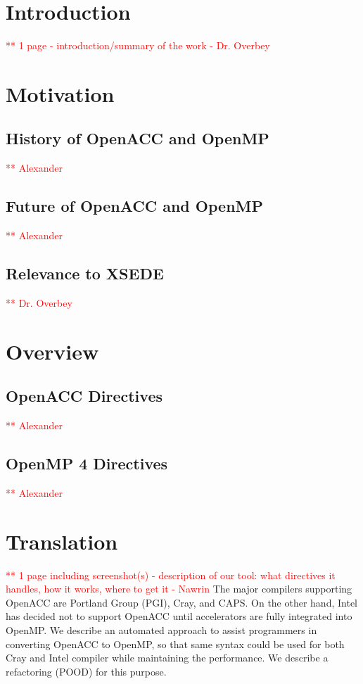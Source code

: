 \documentclass{sig-alternate-05-2015}
\newcommand\todo[1]{\textcolor{red}{** #1}}
\begin{document}

\section{Introduction}
\todo{1 page - introduction/summary of the work - Dr. Overbey}

\section{Motivation}
\subsection{History of OpenACC and OpenMP}
\todo{Alexander}
\subsection{Future of OpenACC and OpenMP}
\todo{Alexander}
\subsection{Relevance to XSEDE}
\todo{Dr. Overbey}

\section{Overview}
\subsection{OpenACC Directives}
\todo{Alexander}
\subsection{OpenMP 4 Directives}
\todo{Alexander}

\section{Translation}
\todo{1 page including screenshot(s) - description of our tool: what directives it handles, how it works, where to get it - Nawrin}
The major compilers supporting OpenACC are Portland Group (PGI), Cray, and CAPS. On the other hand, Intel has decided not to support OpenACC until accelerators are fully integrated into OpenMP. We describe an automated approach to assist programmers in converting OpenACC to OpenMP, so that same syntax could be used for both Cray and Intel compiler while maintaining the performance. We describe a refactoring (POOD) for this purpose.
\end{document}
